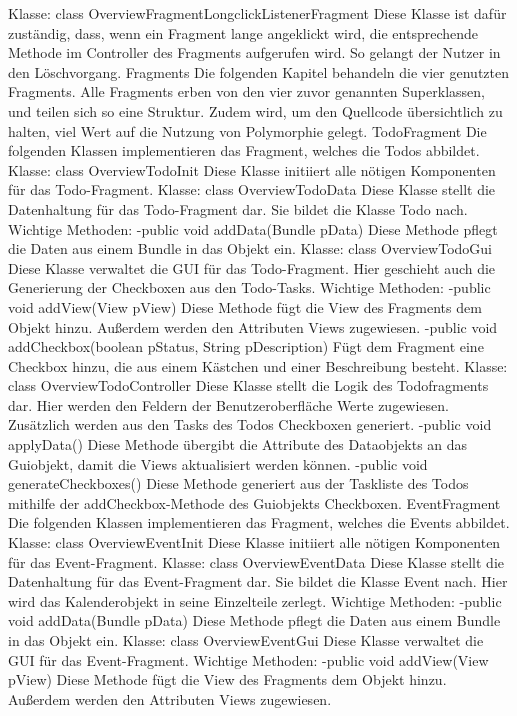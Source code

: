 Klasse: class OverviewFragmentLongclickListenerFragment
Diese Klasse ist dafür zuständig, dass, wenn ein Fragment lange angeklickt wird, die entsprechende Methode im Controller des Fragments aufgerufen wird. So gelangt der Nutzer in den Löschvorgang.
Fragments
Die folgenden Kapitel behandeln die vier genutzten Fragments. Alle Fragments erben von den vier zuvor genannten Superklassen, und teilen sich so eine Struktur. Zudem wird, um den Quellcode übersichtlich zu halten, viel Wert auf die Nutzung von Polymorphie gelegt.
TodoFragment
Die folgenden Klassen implementieren das Fragment, welches die Todos abbildet.
Klasse: class OverviewTodoInit
Diese Klasse initiiert alle nötigen Komponenten für das Todo-Fragment.
Klasse: class OverviewTodoData
Diese Klasse stellt die Datenhaltung für das Todo-Fragment dar. Sie bildet die Klasse Todo nach.
Wichtige Methoden:
-public void addData(Bundle pData)
Diese Methode pflegt die Daten aus einem Bundle in das Objekt ein.
Klasse: class OverviewTodoGui
Diese Klasse verwaltet die GUI für das Todo-Fragment. Hier geschieht auch die Generierung der Checkboxen aus den Todo-Tasks.
Wichtige Methoden:
-public void addView(View pView)
Diese Methode fügt die View des Fragments dem Objekt hinzu. Außerdem werden den Attributen Views zugewiesen.
-public void addCheckbox(boolean pStatus, String pDescription)
Fügt dem Fragment eine Checkbox hinzu, die aus einem Kästchen und einer Beschreibung besteht.
Klasse: class OverviewTodoController
Diese Klasse stellt die Logik des Todofragments dar. Hier werden den Feldern der Benutzeroberfläche Werte zugewiesen. Zusätzlich werden aus den Tasks des Todos Checkboxen generiert.
-public void applyData()
Diese Methode übergibt die Attribute des Dataobjekts an das Guiobjekt, damit die Views aktualisiert werden können.
-public void generateCheckboxes()
Diese Methode generiert aus der Taskliste des Todos mithilfe der addCheckbox-Methode des Guiobjekts Checkboxen.
EventFragment
Die folgenden Klassen implementieren das Fragment, welches die Events abbildet.
Klasse: class OverviewEventInit
Diese Klasse initiiert alle nötigen Komponenten für das Event-Fragment.
Klasse: class OverviewEventData
Diese Klasse stellt die Datenhaltung für das Event-Fragment dar. Sie bildet die Klasse Event nach. Hier wird das Kalenderobjekt in seine Einzelteile zerlegt.
Wichtige Methoden:
-public void addData(Bundle pData)
Diese Methode pflegt die Daten aus einem Bundle in das Objekt ein.
Klasse: class OverviewEventGui
Diese Klasse verwaltet die GUI für das Event-Fragment.
Wichtige Methoden:
-public void addView(View pView)
Diese Methode fügt die View des Fragments dem Objekt hinzu. Außerdem werden den Attributen Views zugewiesen.
